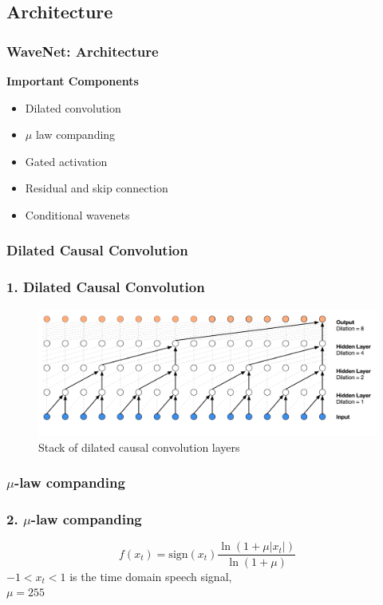\documentclass{beamer}
\begin{document}
  \subsection{Architecture}
  \begin{frame}
    \frametitle{WaveNet: Architecture}
    \textbf{Important Components}\\
      \begin{itemize}
        \item Dilated convolution
        \item $\mu$ law companding
        \item Gated activation
        \item Residual and skip connection
        \item Conditional wavenets
      \end{itemize}
  \end{frame}

  \subsubsection{Dilated Causal Convolution}
  \begin{frame}
    \frametitle{1. Dilated Causal Convolution}
    \begin{figure}
      \includegraphics[scale=0.22]{images/wavenet_arch_dilated_conv.png}
      \caption{Stack of dilated causal convolution layers}
    \end{figure}
  \end{frame}

  \subsubsection{$\mu$-law companding}
  \begin{frame}
    \frametitle{2. $\mu$-law companding}
    \centering
    \begin{equation*}
      f(x_t) = \text{sign}(x_t)\frac{\ln(1 + \mu|x_t|)}{\ln(1 + \mu)}
    \end{equation*}
    $-1 < x_t < 1$ is the time domain speech signal,\\
    $\mu = 255$
  \end{frame}
\end{document}
